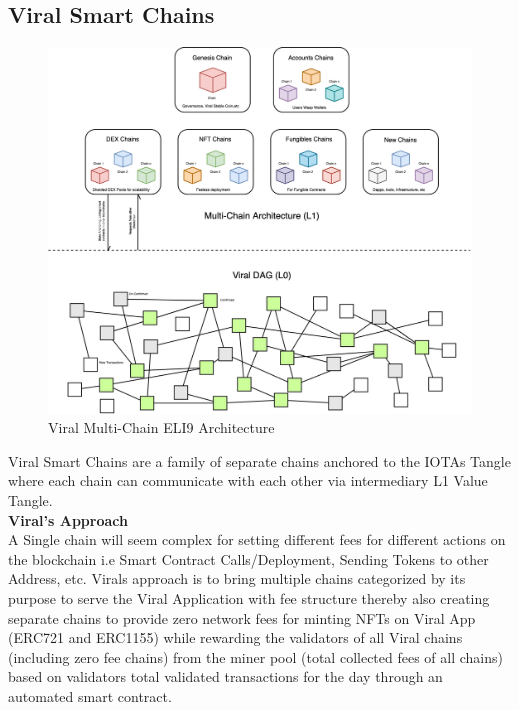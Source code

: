 \documentclass[10pt]{article}
\begin{document}
\subsection{Viral Smart Chains}

\begin{figure}[H]
\includegraphics[width=\textwidth]{Architecture}
\caption{Viral Multi-Chain ELI9 Architecture}
\end{figure}

Viral Smart Chains are a family of separate chains anchored to the IOTA\textsc{}s Tangle where each chain can communicate with each other via intermediary L1 Value Tangle.\\

\textbf{Viral's Approach}\\

A Single chain will seem complex for setting different fees for different actions on the blockchain i.e Smart Contract Calls/Deployment, Sending Tokens to other Address, etc. Viral\textsc{}s approach is to bring multiple chains categorized by its purpose to serve the Viral Application with fee structure thereby also creating separate chains to provide zero network fees for minting NFTs on Viral App (ERC721 and ERC1155) while rewarding the validators of all Viral chains (including zero fee chains) from the miner pool (total collected fees of all chains) based on validator\textsc{}s total validated transactions for the day through an automated smart contract.\\
\end{document}
